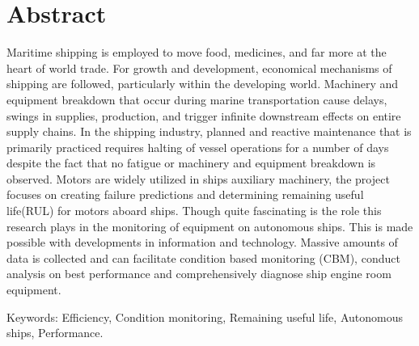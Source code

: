 
\section*{Abstract}
\label{sec:Abstract}
Maritime shipping is employed to move food, medicines, and far more at the heart of world
trade. For growth and development, economical mechanisms of shipping are followed,
particularly within the developing world. Machinery and equipment breakdown that occur
during marine transportation cause delays, swings in supplies, production, and trigger
infinite downstream effects on entire supply chains. In the shipping industry, planned and
reactive maintenance that is primarily practiced requires halting of vessel operations for a
number of days despite the fact that no fatigue or machinery and equipment breakdown is
observed. Motors are widely utilized in ships auxiliary machinery, the project focuses on creating failure predictions and determining remaining useful life(RUL) for motors aboard ships. Though quite fascinating is the role this research plays in the monitoring of equipment on autonomous ships. This is
made possible with developments in information and technology. Massive amounts of
data is collected and can facilitate condition based monitoring (CBM), conduct analysis
on best performance and comprehensively diagnose ship engine room equipment.

Keywords: Efficiency, Condition monitoring, Remaining useful life, Autonomous ships, Performance. 

 



